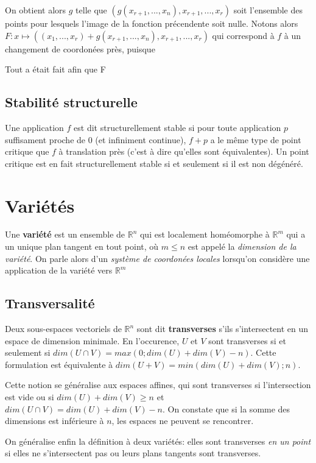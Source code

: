 \documentclass{article}
\begin{document}
On obtient alors $g$ telle que $(g(x_{r+1},...,x_n),x_{r+1},...,x_{r})$ soit l'ensemble des points pour lesquels l'image de la fonction précendente soit nulle. Notons alors $F: x\mapsto ((x_1,...,x_r)+g(x_{r+1},...,x_n),x_{r+1},...,x_{r})$ qui correspond à $f$ à un changement de coordonées près, puisque

Tout a était fait afin que F

\subsection{Stabilité structurelle}

Une application $f$ est dit structurellement stable si pour toute application $p$ suffisament proche de 0 (et infiniment continue), $f+p$ a le même type de point critique que $f$ à translation près (c'est à dire qu'elles sont équivalentes). Un point critique est en fait structurellement stable si et seulement si il est non dégénéré.

\section{Variétés}

Une \textbf{variété} est un ensemble de $\mathbb{R}^n$ qui est localement homéomorphe à $\mathbb{R}^m$ qui a un unique plan tangent en tout point, où $m\leq n$ est appelé la \textit{dimension de la variété}. On parle alors d'un \textit{système de coordonées locales} lorsqu'on considère une application de la variété vers $\mathbb{R}^m$

\subsection{Transversalité}

Deux sous-espaces vectoriels de $\mathbb{R}^n$ sont dit \textbf{transverses} s'ils s'intersectent en un espace de dimension minimale. En l'occurence, $U$ et $V$ sont transverses si et seulement si $dim(U\cap V)=max(0;dim(U)+dim(V)-n)$. Cette formulation est équivalente à $dim(U+V)=min(dim(U)+dim(V); n)$.

Cette notion se généralise aux espaces affines, qui sont transverses si l'intersection est vide ou si $dim(U)+dim(V)\geq n$ et $dim(U\cap V)=dim(U)+dim(V)-n$. On constate que si la somme des dimensions est inférieure à $n$, les espaces ne peuvent se rencontrer.

On généralise enfin la définition à deux variétés: elles sont transverses \textit{en un point} si elles ne s'intersectent pas ou leurs plans tangents sont transverses.
\end{document}
